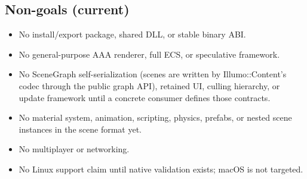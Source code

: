 \subsection{Non-goals (current)}
\begin{itemize}
  \item No install/export package, shared DLL, or stable binary ABI.
  \item No general-purpose AAA renderer, full ECS, or speculative framework.
  \item No SceneGraph self-serialization (scenes are written by
        Illumo::Content's codec through the public graph API), retained UI,
        culling hierarchy, or update framework until a concrete consumer
        defines those contracts.
  \item No material system, animation, scripting, physics, prefabs, or nested
        scene instances in the scene format yet.
  \item No multiplayer or networking.
  \item No Linux support claim until native validation exists; macOS is not targeted.
\end{itemize}
